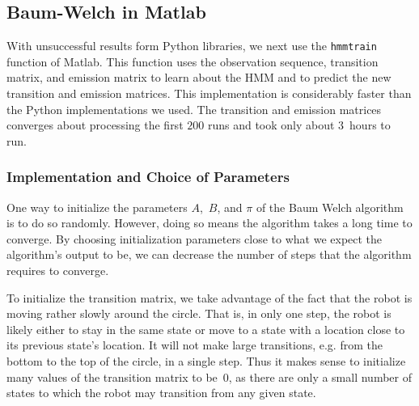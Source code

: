 \documentclass[twoside]{article}
\begin{document}
\subsection{Baum-Welch in Matlab}\label{sec:baum-welch-matlab}

With unsuccessful results form Python libraries, we next use the \texttt{\small hmmtrain} function of Matlab.
This function uses the observation sequence, transition matrix, and emission matrix to learn about the HMM and to predict the new transition and emission matrices.
This implementation is considerably faster than the Python implementations we used.
The transition and emission matrices converges about processing the first $\num{200}$ runs and took only about $\num{3}$~hours to run.

\subsubsection{Implementation and Choice of Parameters}\label{sec:choice-parameters}


One way to initialize the parameters $A$,~$B$, and $\pi$ of the Baum Welch algorithm is to do so randomly.
However, doing so means the algorithm takes a long time to converge.
By choosing initialization parameters close to what we expect the algorithm's output to be, we can decrease the number of steps that the algorithm requires to converge.

To initialize the transition matrix, we take advantage of the fact that the robot is moving rather slowly around the circle.
That is, in only one step, the robot is likely either to stay in the same state or move to a state with a location close to its previous state's location.
It will not make large transitions, e.g. from the bottom to the top of the circle, in a single step.
Thus it makes sense to initialize many values of the transition matrix to be~$0$, as there are only a small number of states to which the robot may transition from any given state.
\end{document}

